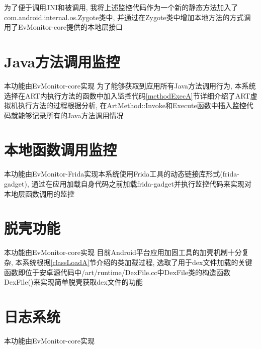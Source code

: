 为了便于调用JNI和被调用, 我将上述监控代码作为一个新的静态方法加入了com.android.internal.os.Zygote类中, 并通过在Zygote类中增加本地方法的方式调用了EvMonitor-core提供的本地层接口\juhao 

\section{Java方法调用监控}
本功能由EvMonitor-core实现\juhao 
为了能够获取到应用所有Java方法调用行为, 本系统选择在ART内执行方法的函数中加入监控代码\juhao  \ref{methodExecA}节详细介绍了ART虚拟机执行方法的过程\juhao 根据分析, 在ArtMethod::Invoke和Execute函数中插入监控代码就能够记录所有的Java方法调用情况\juhao  

\section{本地函数调用监控}
本功能由EvMonitor-Frida实现\juhao 本系统使用Frida工具的动态链接库形式(frida-gadget), 通过在应用加载自身代码之前加载frida-gadget并执行监控代码来实现对本地层函数调用的监控\juhao 

\section{脱壳功能}
本功能由EvMonitor-core实现\juhao 
目前Android平台应用加固工具的加壳机制十分复杂, 本系统根据\ref{classLoadA}节介绍的类加载过程, 选取了用于dex文件加载的关键函数即位于安卓源代码中/art/runtime/DexFile.cc中DexFile类的构造函数DexFile()来实现简单脱壳获取dex文件的功能\juhao 

\section{日志系统}
本功能由EvMonitor-core实现\juhao 
